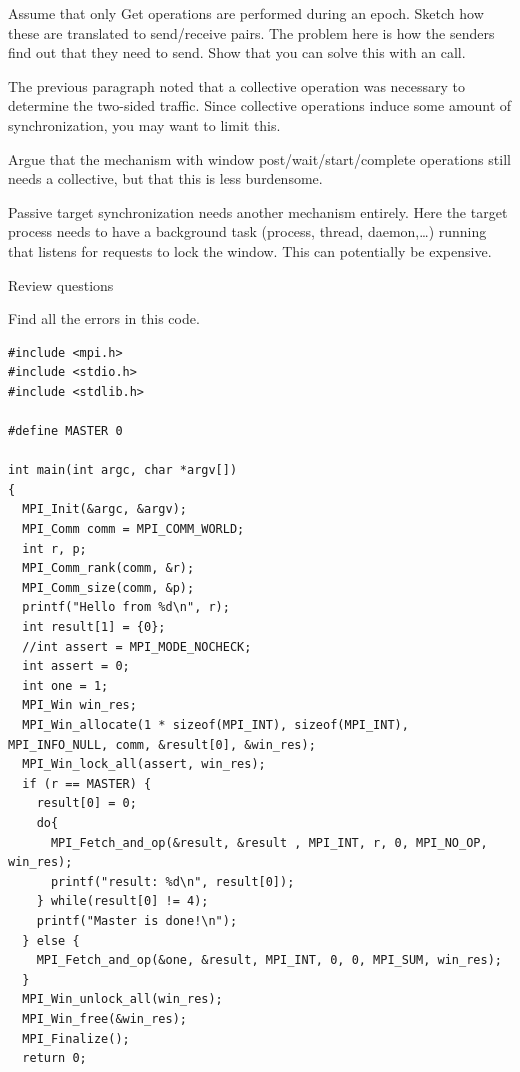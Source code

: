 \begin{exercise}
  Assume that only Get operations are performed during an epoch. 
  Sketch how these are translated to send/receive pairs. 
  The problem here is how the senders find out that they need to send.
  Show that you can solve this with an  call.
\end{exercise}

The previous paragraph noted that a collective operation was necessary
to determine the two-sided traffic. Since collective operations induce
some amount of synchronization, you may want to limit this.

\begin{exercise}
  Argue that the mechanism with window post/wait/start/complete operations
  still needs a collective, but that this is less burdensome.
\end{exercise}

Passive target synchronization needs another mechanism entirely.  Here
the target process needs to have a background task (process, thread,
daemon,\ldots) running that listens for requests to lock the
window. This can potentially be expensive.


\newpage
{} {Review questions}

Find all the errors in this code.
\begin{lstlisting}
#include <mpi.h>
#include <stdio.h>
#include <stdlib.h>

#define MASTER 0

int main(int argc, char *argv[])
{
  MPI_Init(&argc, &argv);
  MPI_Comm comm = MPI_COMM_WORLD;
  int r, p;
  MPI_Comm_rank(comm, &r);
  MPI_Comm_size(comm, &p);
  printf("Hello from %d\n", r);
  int result[1] = {0};
  //int assert = MPI_MODE_NOCHECK;
  int assert = 0;
  int one = 1;
  MPI_Win win_res;
  MPI_Win_allocate(1 * sizeof(MPI_INT), sizeof(MPI_INT), MPI_INFO_NULL, comm, &result[0], &win_res);
  MPI_Win_lock_all(assert, win_res);
  if (r == MASTER) {
    result[0] = 0;
    do{
      MPI_Fetch_and_op(&result, &result , MPI_INT, r, 0, MPI_NO_OP, win_res);  
      printf("result: %d\n", result[0]);
    } while(result[0] != 4);
    printf("Master is done!\n");
  } else {
    MPI_Fetch_and_op(&one, &result, MPI_INT, 0, 0, MPI_SUM, win_res);
  }
  MPI_Win_unlock_all(win_res);
  MPI_Win_free(&win_res);
  MPI_Finalize();
  return 0;
\end{lstlisting}
